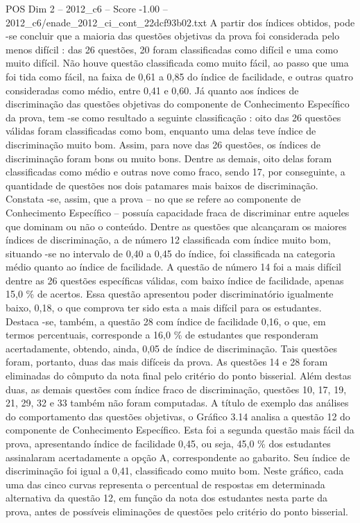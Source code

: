 \begin{textsample}{POS Dim 2 – 2012\_c6 – Score -1.00 – 2012\_c6/enade\_2012\_ci\_cont\_22dcf93b02.txt}
A partir dos índices obtidos, pode -se concluir que a maioria das questões objetivas da prova foi considerada pelo menos difícil : das 26 questões, 20 foram classificadas como difícil e uma como muito difícil.
Não houve questão classificada como muito fácil, ao passo que uma foi tida como fácil, na faixa de 0,61 a 0,85 do índice de facilidade, e outras quatro consideradas como médio, entre 0,41 e 0,60.
Já quanto aos índices de discriminação das questões objetivas do componente de Conhecimento Específico da prova, tem -se como resultado a seguinte classificação : oito das 26 questões válidas foram classificadas como bom, enquanto uma delas teve índice de discriminação muito bom.
Assim, para nove das 26 questões, os índices de discriminação foram bons ou muito bons.
Dentre as demais, oito delas foram classificadas como médio e outras nove como fraco, sendo 17, por conseguinte, a quantidade de questões nos dois patamares mais baixos de discriminação.
Constata -se, assim, que a prova – no que se refere ao componente de Conhecimento Específico – possuía capacidade fraca de discriminar entre aqueles que dominam ou não o conteúdo.
Dentre as questões que alcançaram os maiores índices de discriminação, a de número 12 classificada com índice muito bom, situando -se no intervalo de 0,40 a 0,45 do índice, foi classificada na categoria médio quanto ao índice de facilidade.
A questão de número 14 foi a mais difícil dentre as 26 questões específicas válidas, com baixo índice de facilidade, apenas 15,0 \% de acertos.
Essa questão apresentou poder discriminatório igualmente baixo, 0,18, o que comprova ter sido esta a mais difícil para os estudantes.
Destaca -se, também, a questão 28 com índice de facilidade 0,16, o que, em termos percentuais, corresponde a 16,0 \% de estudantes que responderam acertadamente, obtendo, ainda, 0,05 de índice de discriminação.
Tais questões foram, portanto, duas das mais difíceis da prova.
As questões 14 e 28 foram eliminadas do cômputo da nota final pelo critério do ponto bisserial.
Além destas duas, as demais questões com índice fraco de discriminação, questões 10, 17, 19, 21, 29, 32 e 33 também não foram computadas.
A título de exemplo das análises do comportamento das questões objetivas, o Gráfico 3.14 analisa a questão 12 do componente de Conhecimento Específico.
Esta foi a segunda questão mais fácil da prova, apresentando índice de facilidade 0,45, ou seja, 45,0 \% dos estudantes assinalaram acertadamente a opção A, correspondente ao gabarito.
Seu índice de discriminação foi igual a 0,41, classificado como muito bom.
Neste gráfico, cada uma das cinco curvas representa o percentual de respostas em determinada alternativa da questão 12, em função da nota dos estudantes nesta parte da prova, antes de possíveis eliminações de questões pelo critério do ponto bisserial.

\end{textsample}
